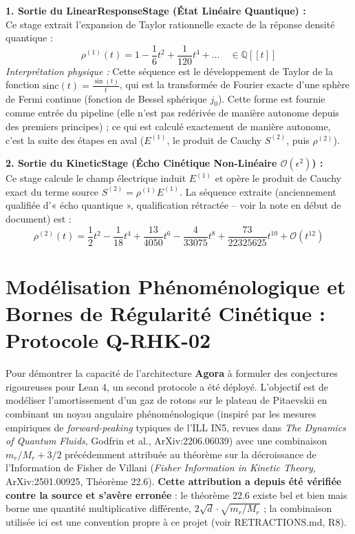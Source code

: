 \documentclass[11pt, a4paper]{article}
\newenvironment{mdframed}[1][]{%
  \medskip
  \noindent
  \begin{lrbox}{\mybox}%
  \begin{minipage}{\dimexpr\linewidth-2\fboxsep-2\fboxrule\relax}%
}{%
  \end{minipage}%
  \end{lrbox}%
  \fcolorbox{black}{gray!5}{\usebox{\mybox}}%
  \medskip
}
\begin{document}
\begin{mdframed}[backgroundcolor=gray!5, linecolor=black, linewidth=1pt]
\textbf{1. Sortie du LinearResponseStage (État Linéaire Quantique) :}\\
Ce stage extrait l'expansion de Taylor rationnelle exacte de la réponse densité quantique :
\begin{equation}
\rho^{(1)}(t) = 1 - \frac{1}{6}t^2 + \frac{1}{120}t^4 + \dots \quad \in \mathbb{Q}[[t]]
\end{equation}
\textit{Interprétation physique :} Cette séquence est le développement de Taylor de la fonction $\mathrm{sinc}(t) = \frac{\sin(t)}{t}$, qui est la transformée de Fourier exacte d'une sphère de Fermi continue (fonction de Bessel sphérique $j_0$). Cette forme est fournie comme entrée du pipeline (elle n'est pas redérivée de manière autonome depuis des premiers principes) ; ce qui est calculé exactement de manière autonome, c'est la suite des étapes en aval ($E^{(1)}$, le produit de Cauchy $S^{(2)}$, puis $\rho^{(2)}$).

\vspace{0.3cm}
\textbf{2. Sortie du KineticStage (Écho Cinétique Non-Linéaire $\mathcal{O}(\epsilon^2)$) :}\\
Ce stage calcule le champ électrique induit $E^{(1)}$ et opère le produit de Cauchy exact du terme source $S^{(2)} = \rho^{(1)} E^{(1)}$. La séquence extraite (anciennement qualifiée d'« écho quantique », qualification rétractée -- voir la note en début de document) est :
\begin{equation}
\rho^{(2)}(t) = \frac{1}{2}t^2 - \frac{1}{18}t^4 + \frac{13}{4050}t^6 - \frac{4}{33075}t^8 + \frac{73}{22325625}t^{10} + \mathcal{O}(t^{12})
\end{equation}
\end{mdframed}

\section{Modélisation Phénoménologique et Bornes de Régularité Cinétique : Protocole Q-RHK-02}

Pour démontrer la capacité de l'architecture \textbf{Agora} à formuler des conjectures rigoureuses pour Lean 4, un second protocole a été déployé. L'objectif est de modéliser l'amortissement d'un gaz de rotons sur le plateau de Pitaevskii en combinant un noyau angulaire phénoménologique (inspiré par les mesures empiriques de \textit{forward-peaking} typiques de l'ILL IN5, revues dans \textit{The Dynamics of Quantum Fluids}, Godfrin et al., ArXiv:2206.06039) avec une combinaison $m_r/M_r + 3/2$ précédemment attribuée au théorème sur la décroissance de l'Information de Fisher de Villani (\textit{Fisher Information in Kinetic Theory}, ArXiv:2501.00925, Théorème 22.6). \textbf{Cette attribution a depuis été vérifiée contre la source et s'avère erronée} : le théorème 22.6 existe bel et bien mais borne une quantité multiplicative différente, $2\sqrt{d}\cdot\sqrt{m_r/M_r}$ ; la combinaison utilisée ici est une convention propre à ce projet (voir RETRACTIONS.md, R8).
\end{document}
